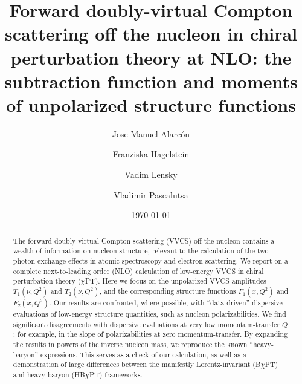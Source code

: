 \documentclass[12pt,preprint,tightenlines,
showpacs,preprintnumbers,amsmath,amssymb,
a4paper,nofootinbib]{revtex4-1}
\begin{document}
\title {Forward doubly-virtual 
Compton scattering off the nucleon in chiral perturbation theory at NLO:
the subtraction function and moments of unpolarized structure functions}
\author{Jose Manuel Alarc\'on}
\author{Franziska Hagelstein}
\author{Vadim Lensky}
\author{Vladimir Pascalutsa}
\begin{abstract}
The forward doubly-virtual 
Compton scattering (VVCS) off the nucleon contains a wealth of information on nucleon structure, relevant to the calculation
of the two-photon-exchange effects in atomic spectroscopy and electron scattering. We report on a complete next-to-leading order (NLO)
calculation of low-energy VVCS in chiral perturbation
theory ($\chi$PT). 
Here we focus on the unpolarized VVCS amplitudes $T_1(\nu, Q^2)$
and $T_2(\nu, Q^2)$, and the corresponding structure functions
$F_1(x, Q^2)$ and $F_2(x,Q^2)$. Our results are confronted, where possible, with ``data-driven'' dispersive evaluations of 
low-energy structure 
quantities, such as nucleon polarizabilities.  We find  significant disagreements with dispersive evaluations at very
low momentum-transfer $Q$; for example,
in the slope of polarizabilities at zero momentum-transfer. 
By expanding the results in powers of the inverse nucleon  mass, we reproduce the known ``heavy-baryon'' expressions. This serves as a check of our calculation, as well as a demonstration of large differences between the manifestly Lorentz-invariant (B$\chi$PT)
and heavy-baryon (HB$\chi$PT) frameworks. 
 
 

\end{abstract}
\pacs{}
\date{\today}
\maketitle
\end{document}
